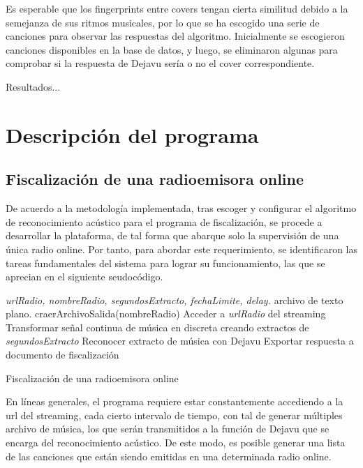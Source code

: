 Es esperable que los fingerprints entre covers tengan cierta similitud debido a la semejanza de sus ritmos musicales, por lo que se ha escogido una serie de canciones para observar las respuestas del algoritmo. Inicialmente se escogieron canciones disponibles en la base de datos, y luego, se eliminaron algunas para comprobar si la respuesta de Dejavu sería o no el cover correspondiente.

Resultados...


\section{Descripción del programa} \label{sec:DescripcionPrograma}

\subsection{Fiscalización de una radioemisora online}

De acuerdo a la metodología implementada, tras escoger y configurar el algoritmo de reconocimiento acústico para el programa de fiscalización, se procede a desarrollar la plataforma, de tal forma que abarque solo la supervisión de una única radio online. Por tanto, para abordar este requerimiento, se identificaron las tareas fundamentales del sistema para lograr su funcionamiento, las que se aprecian en el siguiente seudocódigo.




\begin{algorithm}
\begin{algorithmic}[1]
\REQUIRE \textit{urlRadio, nombreRadio, segundosExtracto, fechaLimite, delay.}
\ENSURE archivo de texto plano.
\STATE craerArchivoSalida(nombreRadio)
\STATE Acceder a \textit{urlRadio} del streaming
\STATE Transformar señal continua de música en discreta creando extractos de \textit{segundosExtracto} 
\STATE Reconocer extracto de música con Dejavu
\STATE Exportar respuesta a documento de fiscalización
\ENDWHILE

\end{algorithmic}
\caption{Fiscalización de una radioemisora online}\label{alg:Fiscalizacion1Radio}
\end{algorithm}

En líneas generales, el programa requiere estar constantemente accediendo a la url del streaming, cada cierto intervalo de tiempo, con tal de generar múltiples archivo de música, los que serán transmitidos a la función de Dejavu que se encarga del reconocimiento acústico. De este modo, es posible generar una lista de las canciones que están siendo emitidas en una determinada radio online.  

